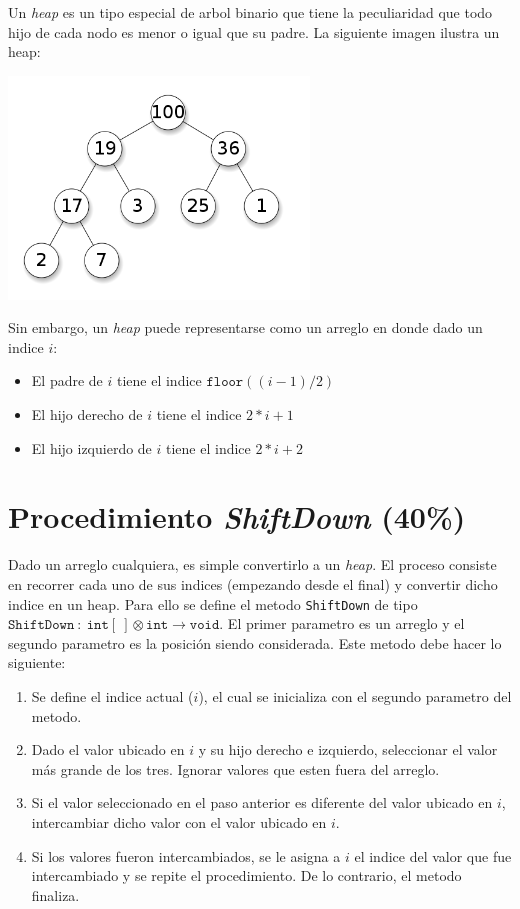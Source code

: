 \documentclass{article}
\begin{document}
Un \emph{heap} es un tipo especial de arbol binario que tiene la peculiaridad que todo hijo
de cada nodo es menor o igual que su padre. La siguiente imagen ilustra un heap:
\\
\begin{center}
        \includegraphics[width=8cm]{./heap.png}
\end{center}
Sin embargo, un \emph{heap} puede representarse como un arreglo en donde dado un indice $i$:
\begin{itemize}
        \item{El padre de $i$ tiene el indice $\mathtt{floor}((i-1)/2)$}
        \item{El hijo derecho de $i$ tiene el indice $2*i+1$}
        \item{El hijo izquierdo de $i$ tiene el indice $2*i+2$}
\end{itemize}

\section*{Procedimiento \emph{ShiftDown} (40\%)}
Dado un arreglo cualquiera, es simple convertirlo a un \emph{heap}. El proceso consiste
en recorrer cada uno de sus indices (empezando desde el final) y convertir dicho indice
en un heap. Para ello se define el metodo \texttt{ShiftDown}\cite{HeapSort} de tipo $\mathtt{ShiftDown}\ :
\ \mathtt{int}[\ ]\otimes\mathtt{int}\rightarrow\mathtt{void}$. El primer parametro es un
arreglo y el segundo parametro es la posici\'on siendo considerada. Este metodo debe hacer
lo siguiente:
\begin{enumerate}
        \item{Se define el indice actual ($i$), el cual se inicializa con el segundo parametro del metodo.}
        \item{Dado el valor ubicado en $i$ y su hijo derecho e izquierdo, seleccionar el valor m\'as grande
        de los tres. Ignorar valores que esten fuera del arreglo. }
        \item{Si el valor seleccionado en el paso anterior es diferente del valor ubicado en $i$,
        intercambiar dicho valor con el valor ubicado en $i$.}
        \item{Si los valores fueron intercambiados, se le asigna a $i$ el indice del valor que fue
        intercambiado y se repite el procedimiento. De lo contrario, el metodo finaliza.}
\end{enumerate}
\end{document}
